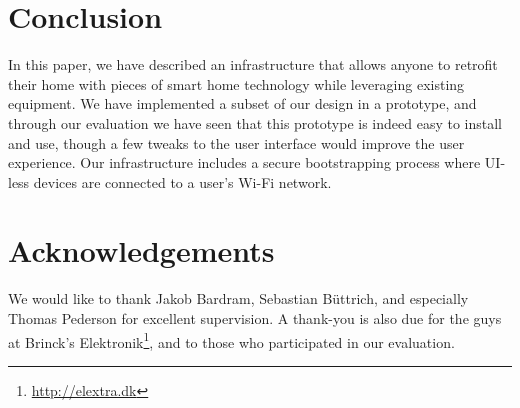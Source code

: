 \documentclass{ubicomp2012}
\begin{document}
\section{Conclusion}

In this paper, we have described an infrastructure that allows anyone to retrofit their home with pieces of smart home technology while leveraging existing equipment. We have implemented a subset of our design in a prototype, and through our evaluation we have seen that this prototype is indeed easy to install and use, though a few tweaks to the user interface would improve the user experience. Our infrastructure includes a secure bootstrapping process where UI-less devices are connected to a user's Wi-Fi network.

\section{Acknowledgements}

We would like to thank Jakob Bardram, Sebastian B\"{u}ttrich, and especially Thomas Pederson for excellent supervision. A thank-you is also due for the guys at Brinck's Elektronik\footnote{\url{http://elextra.dk}}, and to those who participated in our evaluation.



\end{document}
